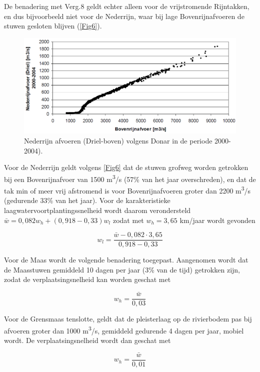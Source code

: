 De benadering met Verg.8 geldt echter alleen voor de vrijstromende Rijntakken, en dus bijvoorbeeld niet voor de Nederrijn, waar bij lage Bovenrijnafvoeren de stuwen gesloten blijven (\autoref{Fig6}).

\begin{figure}
\includegraphics[width=\columnwidth]{figures/Fig6.png}
\caption{Nederrijn afvoeren (Driel-boven) volgens Donar in de periode 2000-2004).}
\label{Fig6}
\end{figure}

Voor de Nederrijn geldt volgens \autoref{Fig6} dat de stuwen grofweg worden getrokken bij een Bovenrijnafvoer van 1500 m\textsuperscript{3}/s (57\% van het jaar overschreden), en dat de tak min of meer vrij afstromend is voor Bovenrijnafvoeren groter dan 2200 m\textsuperscript{3}/s (gedurende 33\% van het jaar). Voor de karakteristieke laagwatervoortplantingssnelheid wordt daarom verondersteld $\bar{w} = 0,082 w_h + (0,918 - 0,33) w_l$ zodat met $w_h = 3,65$ km/jaar wordt gevonden

\begin{equation}
w_l = \frac{\bar{w} - 0,082 \cdot 3,65}{0,918 - 0,33}
\end{equation}

Voor de Maas wordt de volgende benadering toegepast.
Aangenomen wordt dat de Maasstuwen gemiddeld 10 dagen per jaar (3\% van de tijd) getrokken zijn, zodat de verplaatsingsnelheid kan worden geschat met

\begin{equation}
w_h = \frac{\bar{w}}{0,03}
\end{equation}


Voor de Grensmaas tenslotte, geldt dat de pleisterlaag op de rivierbodem pas bij afvoeren groter dan 1000 m\textsuperscript{3}/s, gemiddeld gedurende 4 dagen per jaar, mobiel wordt.
De verplaatsingsnelheid wordt dan geschat met

\begin{equation}
w_h = \frac{\bar{w}}{0,01}
\end{equation}


